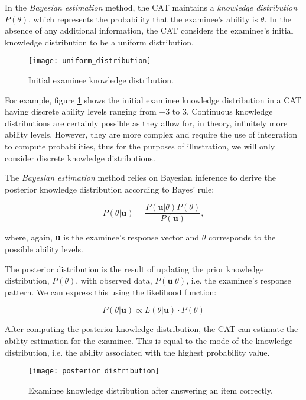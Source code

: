 In the \textit{Bayesian estimation} method, the CAT maintains a \textit{knowledge distribution} $P(\theta)$, which represents the probability that the examinee's ability is $\theta$. In the absence of any additional information, the CAT considers the examinee's initial knowledge distribution to be a uniform distribution.

\begin{figure}[H]
\centering
\texttt{[image: uniform\_distribution]}
\caption{Initial examinee knowledge distribution.}
\label{fig:uniform_distribution}
\end{figure}

For example, figure \ref{fig:uniform_distribution} shows the initial examinee knowledge distribution in a CAT having discrete ability levels ranging from $-3$ to $3$. Continuous knowledge distributions are certainly possible as they allow for, in theory, infinitely more ability levels. However, they are more complex and require the use of integration to compute probabilities, thus for the purposes of illustration, we will only consider discrete knowledge distributions. \newline

The \textit{Bayesian estimation} method relies on Bayesian inference to derive the posterior knowledge distribution according to Bayes' rule:

$$P(\theta | \textbf{u}) = \dfrac{P(\textbf{u} | \theta)P(\theta)}{P(\textbf{u})} ,$$

where, again, \textbf{u} is the examinee's response vector and $\theta$ corresponds to the possible ability levels.\newline

The posterior distribution is the result of updating the prior knowledge distribution, $P(\theta)$, with observed data, $P(\textbf{u} | \theta)$, i.e. the examinee's response pattern. We can express this using the likelihood function:

$$P(\theta | \textbf{u}) \propto L(\theta | \textbf{u}) \cdot P(\theta)$$

After computing the posterior knowledge distribution, the CAT can estimate the ability estimation for the examinee. This is equal to the mode of the knowledge distribution, i.e. the ability associated with the highest probability value.

\begin{figure}[H]
\centering
\texttt{[image: posterior\_distribution]}
\caption{Examinee knowledge distribution after answering an item correctly.}
\label{fig:posterior_distribution}
\end{figure}

